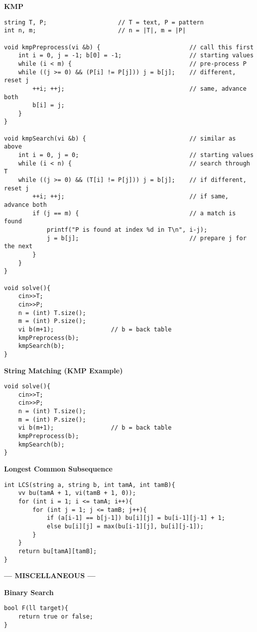 \documentclass{article}
\begin{document}
\begin{multicols}{2}
\large
\huge\textbf{KMP}
\large
\begin{lstlisting}
string T, P;                    // T = text, P = pattern
int n, m;                       // n = |T|, m = |P|

void kmpPreprocess(vi &b) {                         // call this first
	int i = 0, j = -1; b[0] = -1;                   // starting values
	while (i < m) {                                 // pre-process P
	while ((j >= 0) && (P[i] != P[j])) j = b[j];    // different, reset j
		++i; ++j;                                   // same, advance both
		b[i] = j;
	}
}

void kmpSearch(vi &b) {                             // similar as above
	int i = 0, j = 0;                               // starting values
	while (i < n) {                                 // search through T
	while ((j >= 0) && (T[i] != P[j])) j = b[j];    // if different, reset j
		++i; ++j;                                   // if same, advance both
		if (j == m) {                               // a match is found
			printf("P is found at index %d in T\n", i-j);
			j = b[j];                               // prepare j for the next
		}
	}
}

void solve(){
	cin>>T;
	cin>>P;
	n = (int) T.size();
	m = (int) P.size();
	vi b(m+1);                // b = back table
	kmpPreprocess(b);
	kmpSearch(b);
}
\end{lstlisting}

\large
\huge\textbf{String Matching (KMP Example)}
\large
\begin{lstlisting}
void solve(){
    cin>>T;
    cin>>P;
    n = (int) T.size();
    m = (int) P.size();
    vi b(m+1);                // b = back table
    kmpPreprocess(b);
    kmpSearch(b);
}
\end{lstlisting}

\large
\huge\textbf{Longest Common Subsequence}
\large
\begin{lstlisting}
int LCS(string a, string b, int tamA, int tamB){
	vv bu(tamA + 1, vi(tamB + 1, 0));
	for (int i = 1; i <= tamA; i++){
		for (int j = 1; j <= tamB; j++){
			if (a[i-1] == b[j-1]) bu[i][j] = bu[i-1][j-1] + 1;
			else bu[i][j] = max(bu[i-1][j], bu[i][j-1]);
		}
	}
	return bu[tamA][tamB];
}	
\end{lstlisting}

\large
\begin{center}
\huge\textbf{--- MISCELLANEOUS ---}
\end{center}
\large

\large
\huge\textbf{Binary Search}
\large
\begin{lstlisting}
bool F(ll target){
    return true or false;
}


\end{lstlisting}
\end{multicols}
\end{document}
